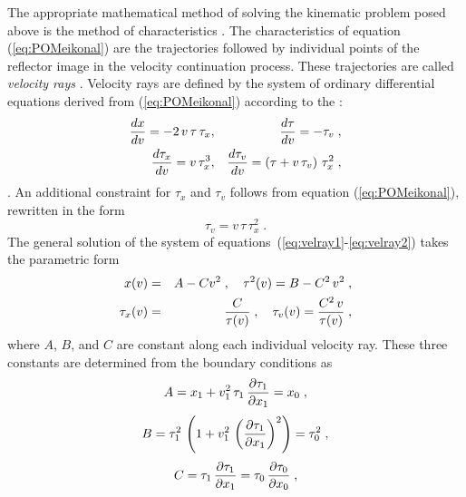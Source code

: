 The appropriate mathematical method of solving the kinematic
problem posed above is the method of characteristics \cite[]{kurant2}. The
characteristics of equation (\ref{eq:POMeikonal}) are the trajectories
followed by individual points of the reflector image in the velocity
continuation process. These trajectories are called {\em velocity rays} 
\cite[]{me,them,adler}. Velocity rays are defined by the system of ordinary
differential equations derived from (\ref{eq:POMeikonal}) according to the
:
\begin{eqnarray}
{{{dx} \over {dv}} = - 2\,v\,\tau\,\tau_x} & , &
{{{d\tau} \over {dv}} = - \tau_v}\;,
\label{eq:velray1} \\
{{{d\tau_x} \over {dv}} = v\,\tau_x^3} & , &
{{{d\tau_v} \over {dv}} = \left(\tau + v\,\tau_v\right)\,\tau_x^2}\;,
\label{eq:velray2} 
\end{eqnarray}
.
An additional constraint for $\tau_x$ and $\tau_v$
follows from equation (\ref{eq:POMeikonal}), rewritten in the form
\begin{equation}
\tau_v = v\,\tau\,\tau_x^2\;. 
\label{eq:equiveikonal} 
\end{equation}
The general solution of the system of
equations~(\ref{eq:velray1}-\ref{eq:velray2}) takes the
parametric form
\begin{eqnarray}
x(v) & = & A - C v^2\;,\quad
\tau^2(v) = B - C^2\,v^2\;,
\label{eq:velrayg1} \\ 
\tau_x(v) & = & {C \over {\tau(v)}}\;,\quad
\tau_v(v) = {{C^2\,v} \over {\tau(v)}}\;,
\label{eq:velrayg2} 
\end{eqnarray}
where $A$, $B$, and $C$ are constant along each individual velocity
ray. These three constants are determined from the boundary conditions
as
\begin{equation}
A = x_1 + v_1^2\,\tau_1\,{{\partial \tau_1} \over {\partial x_1}} = x_0\;,
\label{eq:a} 
\end{equation}
\begin{equation}
B = \tau_1^2\,\left(1 + v_1^2\,
\left({{\partial \tau_1} \over {\partial x_1}}\right)^2\right) = \tau_0^2\;,
\label{eq:b} 
\end{equation}
\begin{equation}
C = \tau_1\,{{\partial \tau_1} \over {\partial x_1}} = 
\tau_0\,{{\partial \tau_0} \over {\partial x_0}}\;,
\label{eq:c} 
\end{equation}
